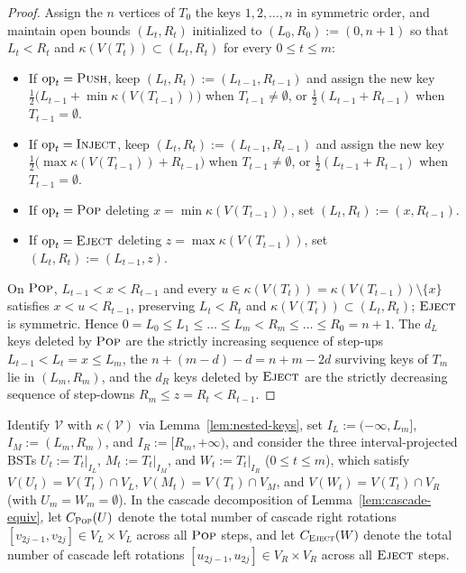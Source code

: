 \documentclass[11pt]{article}
\theoremstyle{definition}
\theoremstyle{remark}
\newcommand{\PUSH}{\textnormal{\scshape Push}}
\newcommand{\POP}{\textnormal{\scshape Pop}}
\newcommand{\INJECT}{\textnormal{\scshape Inject}}
\newcommand{\EJECT}{\textnormal{\scshape Eject}}
\begin{document}
\begin{proof}
Assign the $n$ vertices of $T_0$ the keys $1, 2, \dots, n$ in symmetric order, and maintain open bounds $(L_t, R_t)$ initialized to $(L_0, R_0) := (0, n + 1)$ so that $L_t < R_t$ and $\kappa(V(T_t)) \subset (L_t, R_t)$ for every $0 \le t \le m$:
\begin{itemize}[leftmargin=2em]
  \item If $\mathrm{op}_t = \PUSH$, keep $(L_t, R_t) := (L_{t-1}, R_{t-1})$ and assign the new key $\frac{1}{2}\big(L_{t-1} + \min \kappa(V(T_{t-1}))\big)$ when $T_{t-1} \ne \emptyset$, or $\frac{1}{2}(L_{t-1} + R_{t-1})$ when $T_{t-1} = \emptyset$.
  \item If $\mathrm{op}_t = \INJECT$, keep $(L_t, R_t) := (L_{t-1}, R_{t-1})$ and assign the new key $\frac{1}{2}\big(\max \kappa(V(T_{t-1})) + R_{t-1}\big)$ when $T_{t-1} \ne \emptyset$, or $\frac{1}{2}(L_{t-1} + R_{t-1})$ when $T_{t-1} = \emptyset$.
  \item If $\mathrm{op}_t = \POP$ deleting $x = \min \kappa(V(T_{t-1}))$, set $(L_t, R_t) := (x, R_{t-1})$.
  \item If $\mathrm{op}_t = \EJECT$ deleting $z = \max \kappa(V(T_{t-1}))$, set $(L_t, R_t) := (L_{t-1}, z)$.
\end{itemize}
On $\POP$, $L_{t-1} < x < R_{t-1}$ and every $u \in \kappa(V(T_t)) = \kappa(V(T_{t-1})) \setminus \{x\}$ satisfies $x < u < R_{t-1}$, preserving $L_t < R_t$ and $\kappa(V(T_t)) \subset (L_t, R_t)$; $\EJECT$ is symmetric. Hence $0 = L_0 \le L_1 \le \dots \le L_m < R_m \le \dots \le R_0 = n + 1$. The $d_L$ keys deleted by $\POP$ are the strictly increasing sequence of step-ups $L_{t-1} < L_t = x \le L_m$, the $n + (m - d) - d = n + m - 2d$ surviving keys of $T_m$ lie in $(L_m, R_m)$, and the $d_R$ keys deleted by $\EJECT$ are the strictly decreasing sequence of step-downs $R_m \le z = R_t < R_{t-1}$.
\end{proof}

Identify $\mathcal{V}$ with $\kappa(\mathcal{V})$ via Lemma~\ref{lem:nested-keys}, set $I_L := (-\infty, L_m]$, $I_M := (L_m, R_m)$, and $I_R := [R_m, +\infty)$, and consider the three interval-projected BSTs $U_t := T_t|_{I_L}$, $M_t := T_t|_{I_M}$, and $W_t := T_t|_{I_R}$ ($0 \le t \le m$), which satisfy $V(U_t) = V(T_t) \cap V_L$, $V(M_t) = V(T_t) \cap V_M$, and $V(W_t) = V(T_t) \cap V_R$ (with $U_m = W_m = \emptyset$). In the cascade decomposition of Lemma~\ref{lem:cascade-equiv}, let $C_{\POP}(U)$ denote the total number of cascade right rotations $[v_{2j-1}, v_{2j}] \in V_L \times V_L$ across all $\POP$ steps, and let $C_{\EJECT}(W)$ denote the total number of cascade left rotations $[u_{2j-1}, u_{2j}] \in V_R \times V_R$ across all $\EJECT$ steps.
\end{document}

